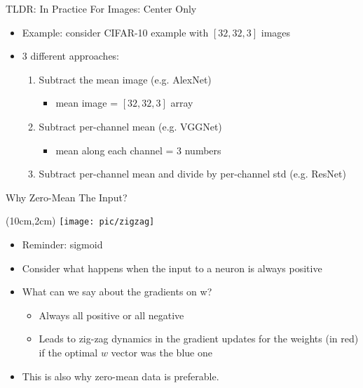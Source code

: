 \documentclass[serif, aspectratio=169]{beamer}
\begin{document}
\begin{frame}{TLDR: In Practice For Images: Center Only}
	\begin{itemize}
		\item Example: consider CIFAR-10 example with $[32,32,3]$ images
		\item 3 different approaches:
		\begin{enumerate}
		\item Subtract the mean image (e.g. AlexNet)
			\begin{itemize}
				\item mean image = $[32,32,3]$ array
			\end{itemize}
		\item Subtract per-channel mean (e.g. VGGNet)
			\begin{itemize}
				\item mean along each channel = 3 numbers
			\end{itemize}		
		\item Subtract per-channel mean and divide by per-channel std (e.g. ResNet)
		\end{enumerate}
	\end{itemize}
\end{frame}

\begin{frame}{Why Zero-Mean The Input?}

	\begin{textblock*}{5cm}(10cm,2cm) %
		\texttt{[image: pic/zigzag]}
	\end{textblock*}

	\begin{itemize}
		\item Reminder: sigmoid
		\item Consider what happens when the input \newline to a neuron is always positive
		\item What can we say about the gradients on w? 
		\begin{itemize}
			\item Always all positive or all negative
			\item Leads to zig-zag dynamics in the gradient updates \newline for the weights (in red) if the optimal $w$ vector was \newline the blue one
		\end{itemize}

		\item This is also why zero-mean data is preferable.
	\end{itemize}
	
\end{frame}
\end{document}
